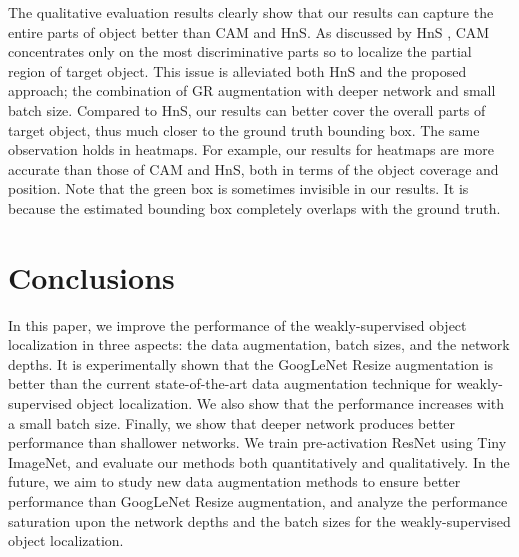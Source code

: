 \documentclass{bmvc2k}
\begin{document}
The qualitative evaluation results clearly show that our results can capture the entire parts of object better than CAM and HnS. As discussed by HnS \cite{singh2017hide}, CAM concentrates only on the most discriminative parts so to localize the partial region of target object. This issue is alleviated both HnS and the proposed approach; the combination of GR augmentation with deeper network and small batch size. Compared to HnS, our results can better cover the overall parts of target object, thus much closer to the ground truth bounding box. The same observation holds in heatmaps. For example, our results for heatmaps are more accurate than those of CAM and HnS, both in terms of the object coverage and position. Note that the green box is sometimes invisible in our results. It is because the estimated bounding box completely overlaps with the ground truth.  





\section{Conclusions}
\label{sec:conclusions}
In this paper, we improve the performance of the weakly-supervised object localization in three aspects: the data augmentation, batch sizes, and the network depths. It is experimentally shown that the GoogLeNet Resize augmentation is better than the current state-of-the-art data augmentation technique \cite{singh2017hide} for weakly-supervised object localization. We also show that the performance increases with a small batch size. Finally, we show that deeper network produces better performance than shallower networks. We train pre-activation ResNet using Tiny ImageNet, and evaluate our methods both quantitatively and qualitatively. In the future, we aim to study new data augmentation methods to ensure better performance than GoogLeNet Resize augmentation, and analyze the performance saturation upon the network depths and the batch sizes for the weakly-supervised object localization.
\end{document}
